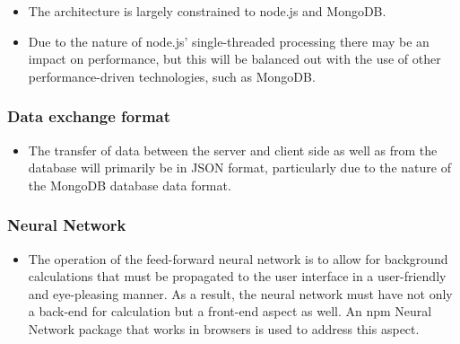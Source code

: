 \begin{itemize}
	\item The architecture is largely constrained to node.js and MongoDB.
	\item Due to the nature of node.js' single-threaded processing there may be an impact on performance, but this will be balanced out with the use of other performance-driven technologies, such as MongoDB.
\end{itemize}

\subsubsection{Data exchange format}
\begin{itemize}
	\item The transfer of data between the server and client side as well as from the database will primarily be in JSON format, particularly due to the nature of the MongoDB database data format.
\end{itemize}

\subsubsection{Neural Network}
\begin{itemize}
	\item The operation of the feed-forward neural network is to allow for background calculations that must be propagated to the user interface in a user-friendly and eye-pleasing manner. As a result, the neural network must have not only a back-end for calculation but a front-end aspect as well. An npm Neural Network package that works in browsers is used to address this aspect.
\end{itemize}